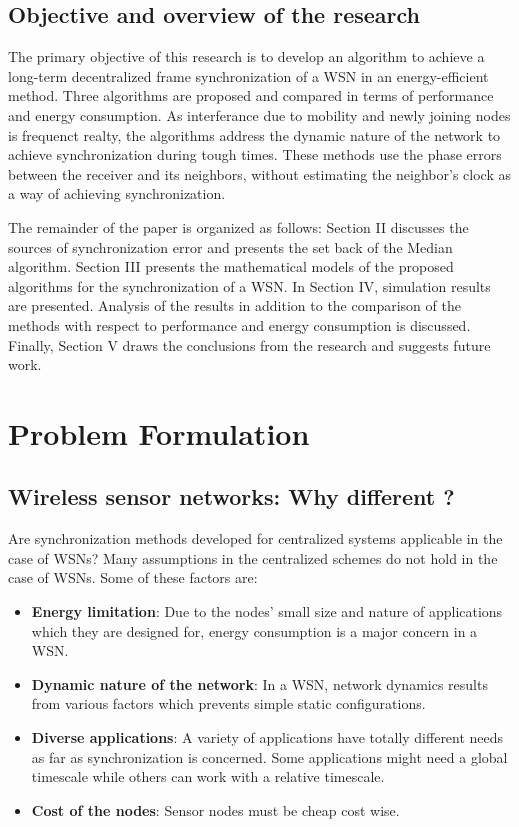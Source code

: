 \documentclass[journal]{IEEEtran}
\begin{document}
\subsection{\textbf{Objective and overview of the research}}
The primary objective of this research is to develop an algorithm to
achieve a long-term decentralized frame synchronization of a WSN in
an energy-efficient method. Three algorithms are proposed and compared in terms of performance and energy consumption. As interferance due to mobility and newly joining nodes is frequenct realty, the algorithms address the dynamic nature of the network to achieve synchronization during tough times. These methods use the phase errors between the receiver and
its neighbors, without estimating the neighbor's clock as a way of achieving synchronization.
\par The remainder of the paper is organized as follows:
Section II discusses the sources of synchronization error and presents the set back of the Median algorithm. Section III presents the mathematical models of the proposed algorithms for the synchronization of a WSN. In Section IV, simulation results are presented. Analysis of the results in addition to the comparison of the methods with respect to performance and energy consumption is discussed. Finally, Section V draws the conclusions from the research and suggests future work.
\section{\textbf{Problem Formulation}}
\subsection{\textbf{Wireless sensor networks: Why different ?}}
Are synchronization methods developed for centralized systems applicable in the case of WSNs? Many
assumptions in the centralized schemes do not hold in the case
of WSNs. Some of these factors are:
\begin{itemize}
\item \textbf{Energy limitation}: Due to the nodes' small size and nature of applications which they
are designed for, energy consumption is a major concern in a WSN.
\item \textbf{Dynamic nature of the network}: In a WSN, network
dynamics results from various factors which prevents simple
static configurations.
\item \textbf{Diverse applications}: A variety of applications
have totally different needs as far as synchronization is concerned.
Some applications might need a global timescale while
others can work with a relative timescale.
\item \textbf{Cost of the nodes}: Sensor nodes must be cheap cost wise.
\end{itemize}
\end{document}
